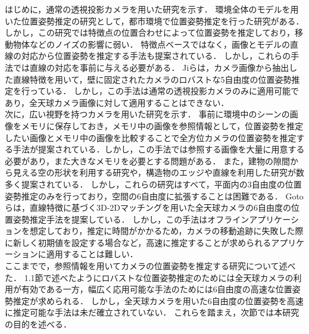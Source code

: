 はじめに，通常の透視投影カメラを用いた研究を示す．
環境全体のモデルを用いた位置姿勢推定の研究として，都市環境で位置姿勢推定を行った研究がある\mbox{\cite{Sattler2011}}．
しかし，この研究では特徴点の位置合わせによって位置姿勢を推定しており，移動物体などのノイズの影響に弱い．
特徴点ベースではなく，画像とモデルの直線の対応から位置姿勢を推定する手法も提案されている\mbox{\cite{Mirzaei2011}}\mbox{\cite{Vakhitov2016}}\mbox{\cite{Xu2017}}．
しかし，これらの手法では直線の対応を事前に与える必要がある．
Jiら\mbox{\cite{Ji2017}}は，カメラ画像から抽出した直線特徴を用いて，壁に固定されたカメラのロバストな5自由度の位置姿勢推定を行っている．
しかし，この手法は通常の透視投影カメラのみに適用可能であり，全天球カメラ画像に対して適用することはできない．
\\

次に，広い視野を持つカメラを用いた研究を示す．
事前に環境中のシーンの画像をメモリに保存しておき，メモリ中の画像を参照情報として，位置姿勢を推定したい画像とメモリ中の画像を比較することで全方位カメラの位置姿勢を推定する手法が提案されている\mbox{\cite{Aihara1998}}．しかし，この手法では参照する画像を大量に用意する必要があり，また大きなメモリを必要とする問題がある．
また，建物の隙間から見える空の形状を利用する研究\mbox{\cite{Ramalingam2011}}や，構造物のエッジや直線を利用した研究\mbox{\cite{Mariottini2007}}\mbox{\cite{Cham2010}}\mbox{\cite{Ishizuka2011}}\mbox{\cite{Caron2012}}が数多く提案されている．
しかし，これらの研究はすべて，平面内の3自由度の位置姿勢推定のみを行っており，空間の6自由度に拡張することは困難である．
Gotoら\mbox{\cite{Goto2018}}は，直線特徴に基づく3D-2Dマッチングを用いた全天球カメラの6自由度の位置姿勢推定手法を提案している．
しかし，この手法はオフラインアプリケーションを想定しており，推定に時間がかかるため，カメラの移動追跡に失敗した際に新しく初期値を設定する場合など，高速に推定することが求められるアプリケーションに適用することは難しい．
\\

ここまでで，参照情報を用いてカメラの位置姿勢を推定する研究について述べた．
1.1節で述べたようにロバストな位置姿勢推定のためには全天球カメラの利用が有効である一方，幅広く応用可能な手法のためには6自由度の高速な位置姿勢推定が求められる．
しかし，全天球カメラを用いた6自由度の位置姿勢を高速に推定可能な手法は未だ確立されていない．
これらを踏まえ，次節では本研究の目的を述べる．

